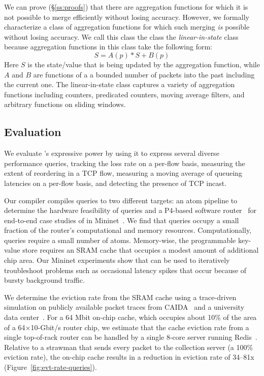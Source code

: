 We can prove (\S\ref{ss:proofs}) that there are aggregation functions for which
it is not possible to merge efficiently without losing accuracy. However, we
formally characterize a class of aggregation functions for which such merging
{\em is} possible without losing accuracy. We call this class the class the
{\em linear-in-state} class because aggregation functions in this class take
the following form:
\begin{equation}
S = A(p) * S + B(p)
\end{equation}
Here $S$ is the state/value that is being updated by the aggregation function,
while $A$ and $B$ are functions of a a bounded number of packets into the past
including the current one. The linear-in-state class captures a variety of
aggregation functions including counters, predicated counters, moving average
filters, and arbitrary functions on sliding windows.

\subsection{Evaluation} We evaluate \TheSystem's expressive power by using it
to express several diverse performance queries, \eg tracking the loss rate on a
per-flow basis, measuring the extent of reordering in a TCP flow, measuring a
moving average of queueing latencies on a per-flow basis, and detecting the
presence of TCP incast.

Our \TheSystem compiler compiles queries to two different targets: an atom
pipeline to determine the hardware feasibility of \TheSystem queries and a
P4-based software router~\cite{p4-bmv2} for end-to-end case studies of
\TheSystem in Mininet~\cite{mininet}. We find that \TheSystem queries occupy a
small fraction of the router's computational and memory resources.
Computationally, queries require a small number of atoms. Memory-wise, the
programmable key-value store requires an SRAM cache that occupies a modest
amount of additional chip area. Our Mininet experiments show that \TheSystem
can be used to iteratively troubleshoot problems such as occasional latency
spikes that occur because of bursty background traffic.

 We determine the eviction rate from the SRAM cache using a trace-driven
simulation on publicly available packet traces from CAIDA~\cite{caida2016,
caida2014} and a university data center~\cite{theo_dc}. For a 64 Mbit on-chip
cache, which occupies about 10\% of the area of a 64×10-Gbit/s router chip, we
estimate that the cache eviction rate from a single top-of-rack router can be
handled by a single 8-core server running Redis~\cite{redis}. Relative to a
strawman that sends every packet to the collection server (\ie a 100\% eviction
rate), the on-chip cache results in a reduction in eviction rate of 34--81x
(Figure~\ref{fig:evt-rate-queries}).


